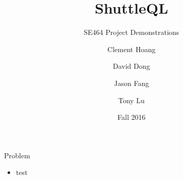 \documentclass{beamer}
\title{ShuttleQL}
\subtitle{SE464 Project Demonstrations}
\author{Clement Hoang \and David Dong \and Jason Fang \and Tony Lu}
\institute{University of Waterloo}
\date{Fall 2016}
\begin{document}
\begin{frame}
  \titlepage
\end{frame}

\begin{frame}{Problem}
  \begin{itemize}
    \item test
  \end{itemize}
\end{frame}
\end{document}
